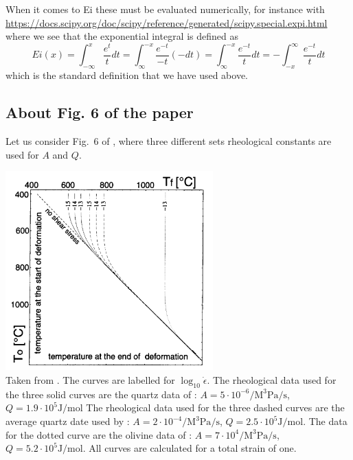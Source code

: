 When it comes to Ei these must be evaluated numerically, for instance with 
\url{https://docs.scipy.org/doc/scipy/reference/generated/scipy.special.expi.html}
where we see that 
the exponential integral is defined as 
\[
Ei(x) 
= \int_{-\infty} ^x \frac{e^t}{t}dt
= \int_{\infty}^{-x} \frac{e^{-t}}{-t} (-dt)
= \int_{\infty}^{-x} \frac{e^{-t}}{t} dt
= -\int_{-x}^\infty \frac{e^{-t}}{t} dt
\]
which is the standard definition that we have used above.


\subsection*{About Fig. 6 of the paper}

Let us consider Fig.~6 of \textcite{stuw98}, where three different sets rheological constants are used
for $A$ and $Q$.

\begin{center}
\includegraphics[width=8cm]{python_codes/fieldstone_167/images/stuw98_fig6}\\
{\captionfont  Taken from \cite{stuw98}.
The curves are labelled for $\log_{10} \dot\epsilon$. 
The rheological data used for the three solid curves are the quartz data of \cite{brko80}:
$A=5\cdot 10^{-6} \si{\per\cubic\mega\pascal \per \second} $, $Q=1.9\cdot 10^5 \si{\joule\per\mol}$
The rheological data
used for the three dashed curves are the average quartz date used
by \cite{stsa94}: $A=2\cdot 10^{-4} \si{\per\cubic\mega\pascal \per \second} $, $Q=2.5\cdot 10^5 \si{\joule\per\mol}$. The data for the dotted curve are the
olivine data of \cite{brko80}: 
$A=7\cdot 10^{4} \si{\per\cubic\mega\pascal \per \second} $, $Q=5.2\cdot 10^5 \si{\joule\per\mol}$. All curves are calculated for
a total strain of one.
}
\end{center}

